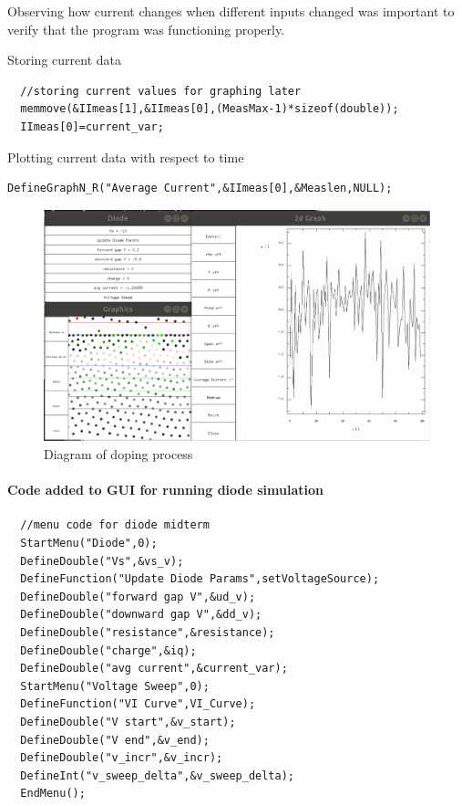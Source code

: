\documentclass[a4paper]{article}
\begin{document}
Observing how current changes when different inputs changed was important to verify that the program was functioning properly.

Storing current data
\begin{verbatim}
  //storing current values for graphing later
  memmove(&IImeas[1],&IImeas[0],(MeasMax-1)*sizeof(double));
  IImeas[0]=current_var;
\end{verbatim}

Plotting current data with respect to time
\begin{verbatim}
DefineGraphN_R("Average Current",&IImeas[0],&Measlen,NULL);
\end{verbatim}

\begin{figure}[H]
\centering
\includegraphics[scale=0.2]{current_graph.png}
\caption{\label{fig} Diagram of doping process}
\end{figure}



\paragraph{Code added to GUI for running diode simulation}
\begin{verbatim}
  //menu code for diode midterm
  StartMenu("Diode",0);
  DefineDouble("Vs",&vs_v);
  DefineFunction("Update Diode Params",setVoltageSource);
  DefineDouble("forward gap V",&ud_v);
  DefineDouble("downward gap V",&dd_v);
  DefineDouble("resistance",&resistance);
  DefineDouble("charge",&iq);
  DefineDouble("avg current",&current_var);
  StartMenu("Voltage Sweep",0);
  DefineFunction("VI Curve",VI_Curve);
  DefineDouble("V start",&v_start);
  DefineDouble("V end",&v_end);
  DefineDouble("v_incr",&v_incr);
  DefineInt("v_sweep_delta",&v_sweep_delta);
  EndMenu();
\end{verbatim}
\end{document}
